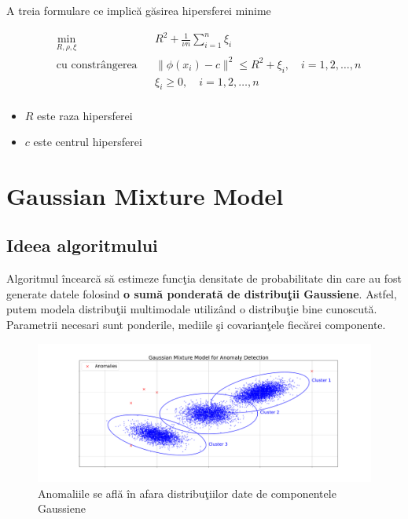 A treia formulare ce implică găsirea hipersferei minime

    \begin{equation}
        \begin{aligned}
        & \underset{R, \rho, \xi}{\text{min}}
        & & R^2 + \frac{1}{\nu n} \sum_{i=1}^{n} \xi_i \\
        & \text{cu constrângerea}
        & & \|\phi(x_i) - c\|^2 \leq R^2 + \xi_i, \quad i=1,2,\ldots,n \\
        &&& \xi_i \geq 0, \quad i=1,2,\ldots,n \\
        \end{aligned}
        \end{equation}
        
        \begin{itemize}
        \item $R$ este raza hipersferei
        \item $c$ este centrul hipersferei
        \end{itemize}
        

\section{Gaussian Mixture Model}

\subsection{Ideea algoritmului}

Algoritmul încearcă să estimeze funcţia densitate de probabilitate 
din care au fost generate datele folosind 
\textbf{o sumă ponderată de distribuţii Gaussiene}.
Astfel, putem modela distribuţii multimodale utilizând o distribuţie bine cunoscută.
Parametrii necesari sunt ponderile, mediile şi covarianţele fiecărei componente.

\begin{figure}[H]
    \centering
    \includegraphics[width=\linewidth]{images/Anomaly-detection-with-Gaussian-mixture-models.pdf}
    \caption{Anomaliile se află în afara distribuţiilor date de componentele Gaussiene}
\end{figure}



